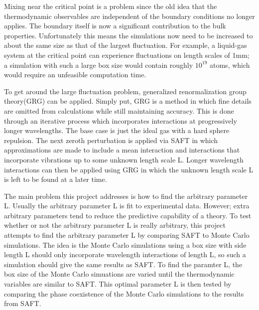 Mixing near the critical point is a problem since the old idea that the thermodynamic observables are independent of the boundary conditions no longer applies. The boundary itself is now a significant contribution to the bulk properties. Unfortunately this means the simulations now need to be increased to about the same size as that of the largest fluctuation. For example, a liquid-gas system at the critical point can experience fluctuations on length scales of 1mm; a simulation with such a large box size would contain roughly $10^{19}$ atoms, which would require an unfeasible computation time.

To get around the large fluctuation problem, generalized renormalization group theory(GRG)\cite{Forte2011} can be applied. Simply put, GRG is a method in which fine details are omitted from calculations while still maintaining accuracy. This is done through an iterative process which incorporates interactions at progressively longer wavelengths. The base case is just the ideal gas with a hard sphere repulsion. The next zeroth perturbation is applied via SAFT in which approximations are made to include a mean interaction and interactions that incorporate vibrations up to some unknown length scale L. Longer wavelength interactions can then be applied using GRG in which the unknown length scale L is left to be found at a later time.

The main problem this project addresses is how to find the arbitrary parameter L. Usually the arbitrary parameter L is fit to experimental data. However; extra arbitrary parameters tend to reduce the predictive capability of a theory. To test whether or not the arbitrary parameter L is really arbitrary, this project attempts to find the arbitrary parameter L by comparing SAFT to Monte Carlo simulations. The idea is the Monte Carlo simulations using a box size with side length L should only incorporate wavelength interactions of length L, so such a simulation should give the same results as SAFT. To find the paramter L, the box size of the Monte Carlo simuations are varied until the thermodynamic variables are similar to SAFT. This optimal parameter L is then tested by comparing the phase coexistence of the Monte Carlo simulations to the results from SAFT.